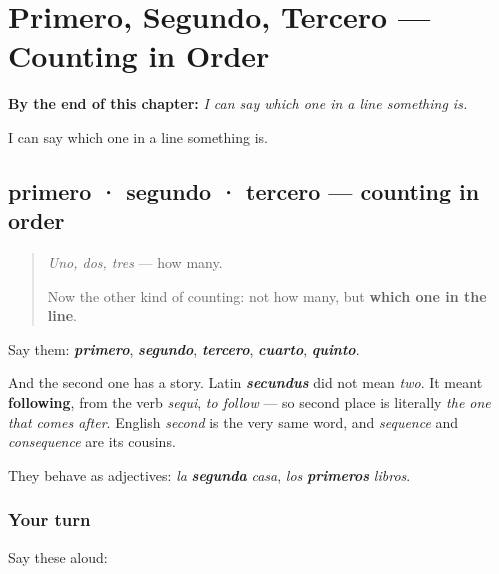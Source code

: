 
\chapter{Primero, Segundo, Tercero --- Counting in Order}
\label{ch:primero}

\begin{chapteropening}
\textbf{By the end of this chapter:} \emph{I can say which one in a line something is.}

I can say which one in a line something is.
\end{chapteropening}

\section[primero · segundo · tercero]{primero · segundo · tercero — counting in order}

\label{lesson:ES-C67-primero}



\begin{quote}
\emph{Uno, dos, tres} — how many.

Now the other kind of counting: not how many, but \textbf{which one in the line}.
\end{quote}

\begin{cousinweb}
Say them: \emph{\textbf{primero}}, \emph{\textbf{segundo}}, \emph{\textbf{tercero}}, \emph{\textbf{cuarto}}, \emph{\textbf{quinto}}.

And the second one has a story. Latin \emph{\textbf{secundus}} did not mean \emph{two}. It meant \textbf{following}, from the verb \emph{sequi}, \emph{to follow} — so second place is literally \emph{the one that comes after}. English \emph{second} is the very same word, and \emph{sequence} and \emph{consequence} are its cousins.

They behave as adjectives: \emph{la} \emph{\textbf{segunda}} \emph{casa}, \emph{los} \emph{\textbf{primeros}} \emph{libros}.
\end{cousinweb}

\subsection*{Your turn}
Say these aloud:

